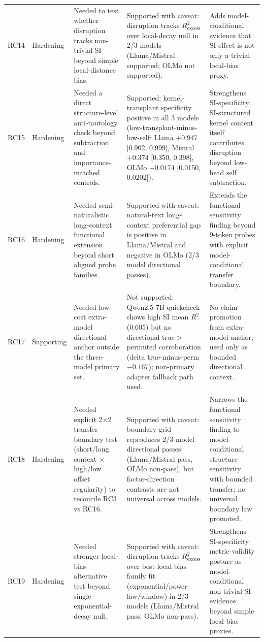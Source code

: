 \documentclass{article}
\begin{document}
\begin{table}[htbp]
\begin{tabular}{p{1.1cm}p{1.5cm}p{3.4cm}p{3.7cm}p{2.5cm}}
RC14 & Hardening & Needed to test whether disruption tracks non-trivial SI beyond simple local-distance bias. & Supported with caveat: disruption tracks $R^2_{\text{excess}}$ over local-decay null in 2/3 models (Llama/Mistral supported; OLMo not supported). & Adds model-conditional evidence that SI effect is not only a trivial local-bias proxy. \\

RC15 & Hardening & Needed a direct structure-level anti-tautology check beyond subtraction and importance-matched controls. & Supported: kernel-transplant specificity positive in all 3 models (low-transplant-minus-low-self: Llama $+0.947$ [0.902, 0.999], Mistral $+0.374$ [0.350, 0.398], OLMo $+0.0174$ [0.0150, 0.0202]). & Strengthens SI-specificity: SI-structured kernel content itself contributes disruption beyond low-head self subtraction. \\

RC16 & Hardening & Needed semi-naturalistic long-context functional extension beyond short aligned probe families. & Supported with caveat: natural-text long-context preferential gap is positive in Llama/Mistral and negative in OLMo (2/3 model directional passes). & Extends the functional sensitivity finding beyond 9-token probes with explicit model-conditional transfer boundary. \\

RC17 & Supporting & Needed low-cost extra-model directional anchor outside the three-model primary set. & Not supported: Qwen2.5-7B quickcheck shows high SI mean $R^2$ (0.605) but no directional true$>$permuted corroboration (delta true-minus-perm $-0.167$); non-primary adapter fallback path used. & No claim promotion from extra-model anchor; used only as bounded directional context. \\

RC18 & Hardening & Needed explicit 2$\times$2 transfer-boundary test (short/long context $\times$ high/low offset regularity) to reconcile RC3 vs RC16. & Supported with caveat: boundary grid reproduces 2/3 model directional passes (Llama/Mistral pass, OLMo non-pass), but factor-direction contrasts are not universal across models. & Narrows the functional sensitivity finding to model-conditional structure sensitivity with bounded transfer; no universal boundary law promoted. \\

RC19 & Hardening & Needed stronger local-bias alternative test beyond single exponential-decay null. & Supported with caveat: disruption tracks $R^2_{\text{excess}}$ over best local-bias family fit (exponential/power-law/window) in 2/3 models (Llama/Mistral pass; OLMo non-pass). & Strengthens SI-specificity metric-validity posture as model-conditional non-trivial SI evidence beyond simple local-bias proxies. \\

\bottomrule
\end{tabular}
\end{table}
\end{document}
